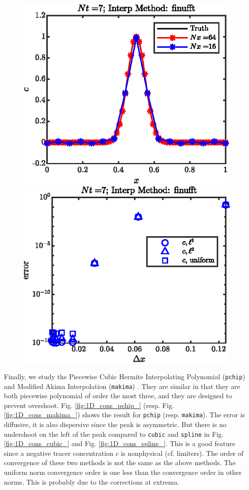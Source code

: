 \documentclass[11pt,letterpaper]{article}
\begin{document}
\begin{figure}[H]
    \centering
    \includegraphics{figs/1D_cons_finufft_sol}
    \includegraphics{figs/1D_cons_finufft_convord}
    \caption{}\label{fig:1D_cons_finufft_}
\end{figure}
Finally, we study the Piecewise Cubic Hermite Interpolating Polynomial (\texttt{pchip}) \cite{FritschCarlson_80} and Modified Akima Interpolation (\texttt{makima}) \cite{Akima_70,Akima_74}. They are similar in that they are both piecewise polynomial of order the most three, and they are designed to prevent overshoot. Fig. \ref{fig:1D_cons_pchip_} (resp. Fig. \ref{fig:1D_cons_makima_}) shows the result for \texttt{pchip} (resp. \texttt{makima}). The error is diffusive, it is also dispersive since the peak is asymmetric. But there is no undershoot on the left of the peak compared to \texttt{cubic} and \texttt{spline} in Fig. \ref{fig:1D_cons_cubic_} and Fig. \ref{fig:1D_cons_spline_}. This is a good feature since a negative tracer concentration $c$ is nonphysical (cf. limiters). The order of convergence of these two methods is not the same as the above methods. The uniform norm convergence order is one less than the convergence order in other norms. This is probably due to the corrections at extrema. 
\end{document}
